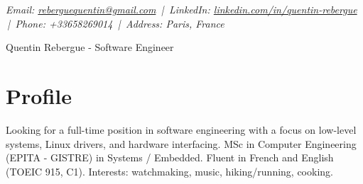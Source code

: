 \documentclass[9pt,a4paper]{article}
\newcommand{\namefont}{\fontsize{18}{22}\selectfont}
\newcommand{\tinyscript}{\fontsize{8}{8}\selectfont}
\begin{document}
\renewcommand\normalsize{\fontsize{10.5}{15}\selectfont}
\normalsize

\begin{center}
  {\tinyscript\itshape
  Email: \href{mailto:reberguequentin@gmail.com}{reberguequentin@gmail.com} \,|\,
  LinkedIn: \href{https://linkedin.com/in/quentin-rebergue}{linkedin.com/in/quentin-rebergue} \,|\,
  Phone: +33658269014 \,|\,
  Address: Paris, France}
\end{center}

\begin{center}
  {\namefont Quentin Rebergue - Software Engineer}
\end{center}

\section*{Profile}
\begin{tcolorbox}[mybox2]
Looking for a full-time position in software engineering with a focus on low-level systems, Linux drivers, and hardware interfacing. MSc in Computer Engineering (EPITA - GISTRE) in Systems / Embedded. Fluent in French and English (TOEIC 915, C1). Interests: watchmaking, music, hiking/running, cooking.
\end{tcolorbox}
\end{document}
